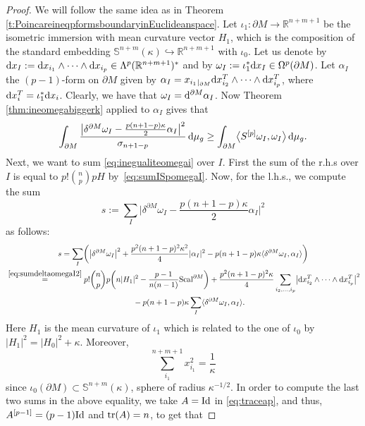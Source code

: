 \documentclass[pdftex]{sigma}
\numberwithin{equation}{section}
\begin{document}
\begin{proof} We will follow the same idea as in Theorem \ref{t:PoincareineqpformsboundaryinEuclideanspace}.
Let $\iota_1\colon\partial M\to \mathbb{R}^{n+m+1}$ be the isometric immersion with mean curvature vector $H_1$, which is the composition of the standard embedding $\mathbb{S}^{n+m}(\kappa)\hookrightarrow \mathbb{R}^{n+m+1}$ with $\iota_0$. Let us denote by ${\rm d}x_I:={\rm d}x_{i_1}\wedge\dots\wedge {\rm d}x_{i_p}\in\Lambda^p(\mathbb{R}^{n+m+1})^*$ and by $\omega_I:=\iota_1^* {\rm d}x_I\in\Omega^p(\partial M)$.
Let $\alpha_I$ the $(p-1)$-form on $\partial M$ given by $\alpha_I=x_{i_1}{}_{|_{\partial M}} {\rm d}x_{i_2}^T\wedge\dots\wedge {\rm d}x_{i_p}^T$, where ${\rm d}x_i^T=\iota_1^* {\rm d}x_i$.
Clearly, we have that $\omega_I={\rm d}^{\partial M}\alpha_I$. Now Theorem \ref{thm:ineomegabiggerk} applied to $\alpha_I$ gives that
\begin{equation}\label{eq:inegualiteomegai}
\int_{\partial M}\frac{\bigl|\delta^{\partial M}\omega_I-\frac{p(n+1-p)\kappa}{2}\alpha_I\bigr|^2}{\sigma_{n+1-p}}\,{\rm d}\mu_g\geq\int_{\partial M}\bigl\langle S^{[p]}\omega_I,\omega_I\bigr\rangle\,{\rm d}\mu_g.
\end{equation}
Next, we want to sum \eqref{eq:inegualiteomegai} over $I$.
First the sum of the r.h.s over $I$ is equal to $p!\binom{n}{p}pH$ by~\eqref{eq:sumISpomegaI}. Now, for the l.h.s., we compute the sum
\[s:=\sum_I\bigl|\delta^{\partial M}\omega_I-\frac{p(n+1-p)\kappa}{2}\alpha_I\bigr|^2\]
as follows:
\begin{gather}
s=\sum_I\biggl(\bigl|\delta^{\partial M}\omega_I\bigr|^2+\frac{p^2(n+1-p)^2\kappa^2}{4}|\alpha_I|^2-p(n+1-p)\kappa\langle \delta^{\partial M}\omega_I,\alpha_I\rangle\biggr)\nonumber\\
\hphantom{}\stackrel{\eqref{eq:sumdeltaomegaI2}}{=}p!\binom{n}{p}p\biggl(n|H_1|^2-\frac{p-1}{n(n-1)}{\rm Scal}^{\partial M}\biggr)+\frac{p^2(n+1-p)^2\kappa}{4}\sum_{i_2,\dots,i_p}\bigl|{\rm d}x_{i_2}^T\wedge\dots\wedge {\rm d}x_{i_p}^T\bigr|^2\nonumber\\
\hphantom{s=}-p(n+1-p)\kappa\sum_I\langle \delta^{\partial M}\omega_I,\alpha_I\rangle. \label{eq:deltabord}
\end{gather}
Here $H_1$ is the mean curvature of $\iota_1$ which is related to the one of $\iota_0$ by $|H_1|^2=|H_0|^2+\kappa$.
Moreover,
\[
\sum_{i_1}^{n+m+1}x_{i_1}^2=\frac{1}{\kappa}
\]
since $\iota_0(\partial M)\subset\mathbb{S}^{n+m}(\kappa)$, sphere of radius $\kappa^{-1/2}$. In order to compute the last two sums in the above equality, we take $A={\rm Id}$ in \eqref{eq:traceap}, and thus, $A^{[p-1]}=(p-1) {\rm Id}$ and ${\rm tr}(A)=n$, to get that

\end{proof}
\end{document}

